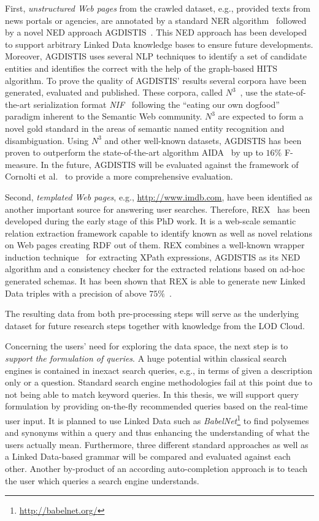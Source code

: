 First, \emph{unstructured Web pages} from the crawled dataset, e.g., provided texts from news portals or agencies, are annotated by a standard NER algorithm~\cite{stanford} followed by a novel NED approach AGDISTIS~\cite{AGDISTIS}.
This NED approach has been developed to support arbitrary Linked Data knowledge bases to ensure future developments.
Moreover, AGDISTIS uses several NLP techniques to identify a set of candidate entities and identifies the correct with the help of the graph-based HITS algorithm. %
To prove the quality of AGDISTIS' results several corpora have been generated, evaluated and published. 
These corpora, called $N^3$~\cite{n3}, use the state-of-the-art serialization format \emph{NIF}~\cite{NIF} following the ``eating our own dogfood'' paradigm inherent to the Semantic Web community. 
$N^3$ are expected to form a novel gold standard in the areas of semantic named entity recognition and disambiguation.
Using $N^3$ and other well-known datasets, AGDISTIS has been proven to outperform the state-of-the-art algorithm AIDA~\cite{AIDA} by up to $16\%$ F-measure.
In the future, AGDISTIS will be evaluated against the framework of Cornolti et al.~\cite{cornolti} to provide a more comprehensive evaluation. 

Second, \emph{templated Web pages}, e.g., \url{http://www.imdb.com}, have been identified as another important source for answering user searches.
Therefore, REX~\cite{REX} has been developed during the early stage of this PhD work.
It is a web-scale semantic relation extraction framework capable to identify known as well as novel relations on Web pages creating RDF out of them.
REX combines a well-known wrapper induction technique~\cite{Crescenzi2013} for extracting XPath expressions, AGDISTIS as its NED algorithm and a consistency checker for the extracted relations based on ad-hoc generated schemas.
It has been shown that REX is able to generate new Linked Data triples with a precision of above $75\%$~\cite{REX}.

The resulting data from both pre-processing steps will serve as the underlying dataset for future research steps together with knowledge from the LOD Cloud.

Concerning the users' need for exploring the data space, %
the next step is to \emph{support the formulation of queries}.
A huge potential within classical search engines is contained in inexact search queries, e.g., in terms of given a description only or a question.
Standard search engine methodologies fail at this point due to not being able to match keyword queries. 
In this thesis, we will support query formulation by providing on-the-fly recommended queries based on the real-time user input.
It is planned to use Linked Data such as \emph{BabelNet}\footnote{\url{http://babelnet.org/}} to find polysemes and synonyms within a query and thus enhancing the understanding of what the users actually mean.
Furthermore, three different standard approaches as well as a Linked Data-based grammar will be compared and evaluated against each other.
Another by-product of an according auto-completion approach is to teach the user which queries a search engine understands.

